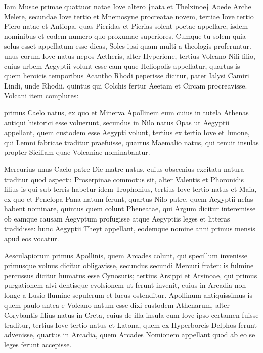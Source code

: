  Iam Musae primae quattuor natae Iove altero †nata et Thelxinoe† Aoede Arche Melete, secundae Iove tertio et Mnemosyne procreatae novem, tertiae Iove tertio Piero natae et Antiopa, quas Pieridas et Pierias solent poetae appellare, isdem nominibus et eodem numero quo proxumae superiores. Cumque tu solem quia solus esset appellatum esse dicas, Soles ipsi quam multi a theologis proferuntur. unus eorum Iove natus nepos Aetheris, alter Hyperione, tertius Volcano Nili filio, cuius urbem Aegyptii volunt esse eam quae Heliopolis appellatur, quartus is quem heroicis temporibus Acantho Rhodi peperisse dicitur, pater Ialysi Camiri Lindi, unde Rhodii, quintus qui Colchis fertur Aeetam et Circam procreavisse. Volcani item complures:

 primus Caelo natus, ex quo et Minerva Apollinem eum cuius in tutela Athenas antiqui historici esse voluerunt, secundus in Nilo natus Opas ut Aegyptii appellant, quem custodem esse Aegypti volunt, tertius ex tertio Iove et Iunone, qui Lemni fabricae traditur praefuisse, quartus Maemalio natus, qui tenuit insulas propter Siciliam quae Volcaniae nominabantur.

 Mercurius unus Caelo patre Die matre natus, cuius obscenius excitata natura traditur quod aspectu Proserpinae commotus sit, alter Valentis et Phoronidis filius is qui sub terris habetur idem Trophonius, tertius Iove tertio natus et Maia, ex quo et Penelopa Pana natum ferunt, quartus Nilo patre, quem Aegyptii nefas habent nominare, quintus quem colunt Pheneatae, qui Argum dicitur interemisse ob eamque causam Aegyptum profugisse atque Aegyptiis leges et litteras tradidisse: hunc Aegyptii Theyt appellant, eodemque nomine anni primus mensis apud eos vocatur.

 Aesculapiorum primus Apollinis, quem Arcades colunt, qui specillum invenisse primusque volnus dicitur obligavisse, secundus secundi Mercuri frater: is fulmine percussus dicitur humatus esse Cynosuris; tertius Arsippi et Arsinoae, qui primus purgationem alvi dentisque evolsionem ut ferunt invenit, cuius in Arcadia non longe a Lusio flumine sepulcrum et lucus ostenditur. Apollinum antiquissimus is quem paulo antea e Volcano natum esse dixi custodem Athenarum, alter Corybantis filius natus in Creta, cuius de illa insula cum Iove ipso certamen fuisse traditur, tertius Iove tertio natus et Latona, quem ex Hyperboreis Delphos ferunt advenisse, quartus in Arcadia, quem Arcades Nomionem appellant quod ab eo se leges ferunt accepisse.

